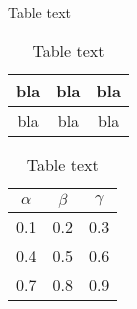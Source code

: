 
\begin{table}[H]
\caption{Table text}
\centering
{}

\label{tab:tab1}
\end{table}

\begin{table}[H]
\caption{Table text}
\centering
\begin{tabular}{|c|c|c|}
\hline
bla & bla & bla
\\
\hline 
bla & bla & bla
\\
\hline
\end{tabular}
\label{tab:tab1}
\end{table}

\begin{table}[H]
\caption{Table text}
\centering
{}
\begin{tabular}{ccc}
\hline
\hline 
$\alpha$ & $\beta$ & $\gamma$
\\
\hline 
\hline 
0.1 & 0.2 & 0.3
\\
0.4 & 0.5 & 0.6
\\
0.7 & 0.8 & 0.9
\\
\hline
\end{tabular}
\label{tab:tab1}
\end{table}
